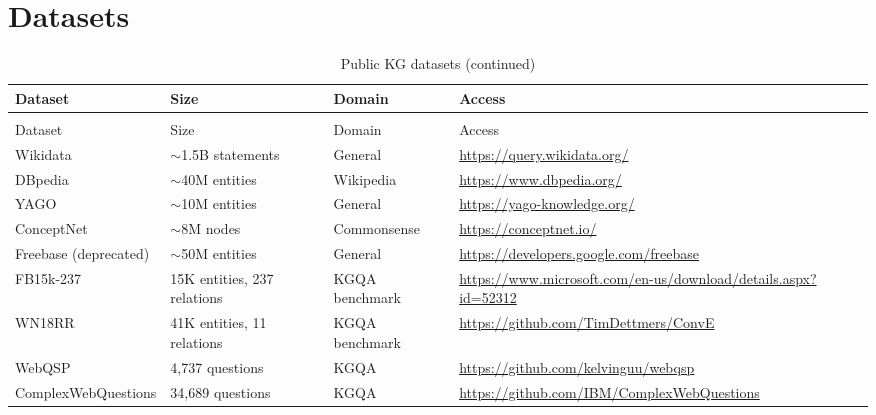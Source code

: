 \documentclass[11pt,a4paper,oneside,openany]{book}
\theoremstyle{definition}
\theoremstyle{plain}
\theoremstyle{remark}
\begin{document}
\section{Datasets}\label{sec:res-datasets}

\begin{longtable}{lp{3cm}p{3cm}p{5cm}}
	\caption{Public KG datasets}
	\label{tab:res-datasets}                                                                                                                    \\
	\toprule
	Dataset               & Size                        & Domain         & Access                                                               \\
	\midrule
	\endfirsthead
	\caption[]{Public KG datasets (continued)}                                                                                                  \\
	\toprule
	Dataset               & Size                        & Domain         & Access                                                               \\
	\midrule
	\endhead
	\bottomrule
	\endfoot
	Wikidata              & $\sim$1.5B statements       & General        & \url{https://query.wikidata.org/}                                    \\
	DBpedia               & $\sim$40M entities          & Wikipedia      & \url{https://www.dbpedia.org/}                                       \\
	YAGO                  & $\sim$10M entities          & General        & \url{https://yago-knowledge.org/}                                    \\
	ConceptNet            & $\sim$8M nodes              & Commonsense    & \url{https://conceptnet.io/}                                         \\
	Freebase (deprecated) & $\sim$50M entities          & General        & \url{https://developers.google.com/freebase}                         \\
	FB15k-237             & 15K entities, 237 relations & KGQA benchmark & \url{https://www.microsoft.com/en-us/download/details.aspx?id=52312} \\
	WN18RR                & 41K entities, 11 relations  & KGQA benchmark & \url{https://github.com/TimDettmers/ConvE}                           \\
	WebQSP                & 4,737 questions             & KGQA           & \url{https://github.com/kelvinguu/webqsp}                            \\
	ComplexWebQuestions   & 34,689 questions            & KGQA           & \url{https://github.com/IBM/ComplexWebQuestions}                     \\
\end{longtable}
\end{document}
